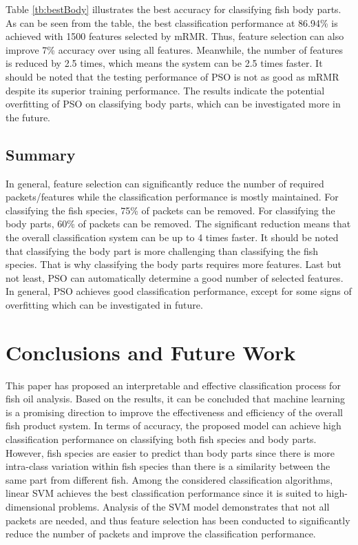 \documentclass[runningheads]{llncs}
\begin{document}
Table \ref{tb:bestBody} illustrates the best accuracy for classifying fish body parts. 
As can be seen from the table, the best classification performance at 86.94\% is achieved with 1500 features selected by mRMR. 
Thus, feature selection can also improve 7\% accuracy over using all features. 
Meanwhile, the number of features is reduced by 2.5 times, which means the system can be 2.5 times faster. 
It should be noted that the testing performance of PSO is not as good as mRMR despite its superior training performance. 
The results indicate the potential overfitting of PSO on classifying body parts, which can be investigated more in the future.

\subsection{Summary}
\label{sec:results-feature-selection-discussion}

In general, feature selection can significantly reduce the number of required packets/features while the classification performance is mostly maintained. 
For classifying the fish species, 75\% of packets can be removed. 
For classifying the body parts, 60\% of packets can be removed. 
The significant reduction means that the overall classification system can be up to 4 times faster. 
It should be noted that classifying the body part is more challenging than classifying the fish species. 
That is why classifying the body parts requires more features. 
Last but not least, PSO can automatically determine a good number of selected features. 
In general, PSO achieves good classification performance, except for some signs of overfitting which can be investigated in future. 

\section{Conclusions and Future Work}

This paper has proposed an interpretable and effective classification process for fish oil analysis. 
Based on the results, it can be concluded that machine learning is a promising direction to improve the effectiveness and efficiency of the overall fish product system. 
In terms of accuracy, the proposed model can achieve high classification performance on classifying both fish species and body parts. 
However, fish species are easier to predict than body parts since there is more intra-class variation within fish species than there is a similarity between the same part from different fish. 
Among the considered classification algorithms, linear SVM achieves the best classification performance since it is suited to high-dimensional problems. 
Analysis of the SVM model demonstrates that not all packets are needed, and thus feature selection has been conducted to significantly reduce the number of packets and improve the classification performance. 
\end{document}
